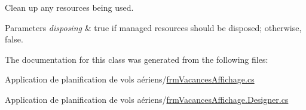 Clean up any resources being used. 


\begin{DoxyParams}{Parameters}
{\em disposing} & true if managed resources should be disposed; otherwise, false.\\
\hline
\end{DoxyParams}


The documentation for this class was generated from the following files\+:\begin{DoxyCompactItemize}
\item 
Application de planification de vols aériens/\hyperlink{frm_vacances_affichage_8cs}{frm\+Vacances\+Affichage.\+cs}\item 
Application de planification de vols aériens/\hyperlink{frm_vacances_affichage_8_designer_8cs}{frm\+Vacances\+Affichage.\+Designer.\+cs}\end{DoxyCompactItemize}
